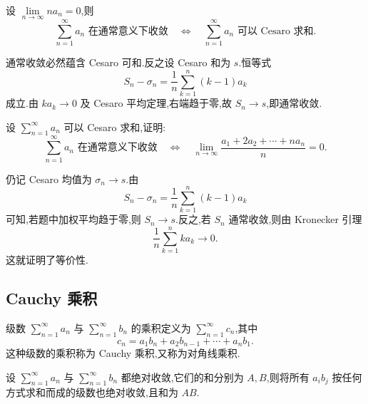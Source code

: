 \begin{example}[\markstar]
    设 $\displaystyle\lim\limits_{n\to\infty}na_n=0$,则
    \[
        \displaystyle\sum\limits_{n=1}^{\infty}a_n\text{ 在通常意义下收敛}
        \quad\Longleftrightarrow\quad
        \sum\limits_{n=1}^{\infty}a_n\text{ 可以 Cesaro 求和}.
    \]
\end{example}
\exampleblank

\begin{solution}
    通常收敛必然蕴含 Cesaro 可和.反之设 Cesaro 和为 $s$.恒等式
    \[
        S_n-\sigma_n=\dfrac{1}{n}\sum\limits_{k=1}^{n}(k-1)a_k
    \]
    成立.由 $ka_k\to0$ 及 Cesaro 平均定理,右端趋于零,故
    $S_n\to s$,即通常收敛.
\end{solution}

\begin{example}[\markstar]
    设 $\displaystyle\sum\limits_{n=1}^{\infty}a_n$ 可以 Cesaro 求和,证明:
    \[
        \displaystyle\sum\limits_{n=1}^{\infty}a_n\text{ 在通常意义下收敛}
        \quad\Longleftrightarrow\quad
        \lim\limits_{n\to\infty}\dfrac{a_1+2a_2+\cdots+na_n}{n}=0.
    \]
\end{example}
\exampleblank

\begin{solution}
    仍记 Cesaro 均值为 $\sigma_n\to s$.由
    \[
        S_n-\sigma_n=\dfrac{1}{n}\sum\limits_{k=1}^{n}(k-1)a_k
    \]
    可知,若题中加权平均趋于零,则 $S_n\to s$.反之,若 $S_n$ 通常收敛,则由 Kronecker 引理
    \[
        \dfrac{1}{n}\sum\limits_{k=1}^{n}ka_k\longrightarrow0.
    \]
    这就证明了等价性.
\end{solution}



\subsection{Cauchy 乘积}

\begin{definition}
    级数 $\displaystyle\sum\limits_{n=1}^{\infty}a_n$ 与 $\displaystyle\sum\limits_{n=1}^{\infty}b_n$ 的乘积定义为 $\displaystyle\sum\limits_{n=1}^{\infty}c_n$,其中
    \[
        c_n=a_1b_n+a_2b_{n-1}+\cdots+a_nb_1.
    \]
    这种级数的乘积称为 Cauchy 乘积,又称为对角线乘积.
\end{definition}

\begin{theorem}
    设 $\displaystyle\sum\limits_{n=1}^{\infty}a_n$ 与 $\displaystyle\sum\limits_{n=1}^{\infty}b_n$ 都绝对收敛,它们的和分别为 $A,B$,则将所有 $a_ib_j$ 按任何方式求和而成的级数也绝对收敛,且和为 $AB$.
\end{theorem}

